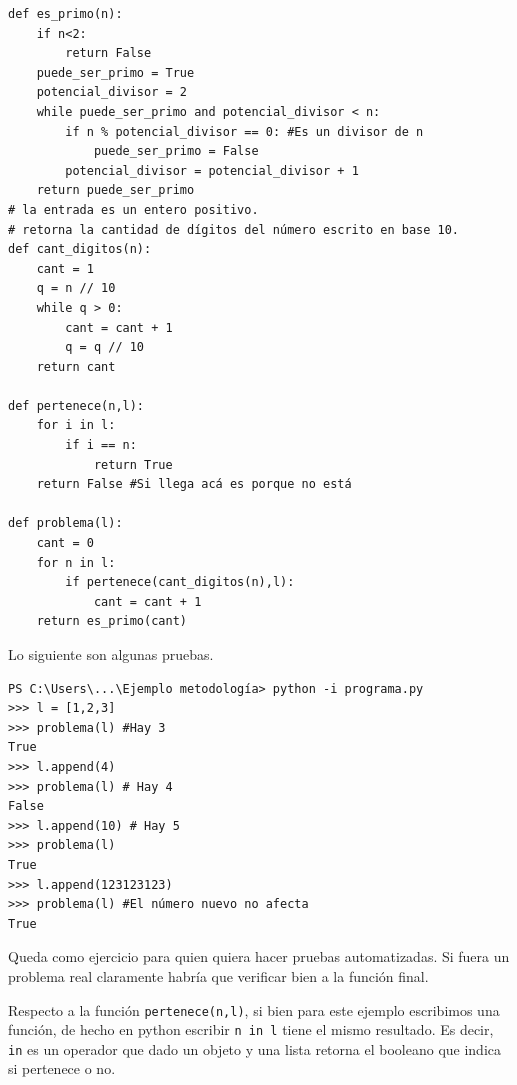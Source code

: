 \documentclass[a4paper, 12pt]{report}
\theoremstyle{definition}
\begin{document}
\begin{verbatim}
def es_primo(n):
    if n<2:
        return False
    puede_ser_primo = True
    potencial_divisor = 2
    while puede_ser_primo and potencial_divisor < n:
        if n % potencial_divisor == 0: #Es un divisor de n
            puede_ser_primo = False
        potencial_divisor = potencial_divisor + 1
    return puede_ser_primo
# la entrada es un entero positivo.
# retorna la cantidad de dígitos del número escrito en base 10.
def cant_digitos(n):
    cant = 1
    q = n // 10
    while q > 0:
        cant = cant + 1
        q = q // 10
    return cant

def pertenece(n,l):
    for i in l:
        if i == n:
            return True
    return False #Si llega acá es porque no está

def problema(l):
    cant = 0
    for n in l:
        if pertenece(cant_digitos(n),l):
            cant = cant + 1
    return es_primo(cant)
\end{verbatim}

Lo siguiente son algunas pruebas.
\begin{verbatim}
PS C:\Users\...\Ejemplo metodología> python -i programa.py
>>> l = [1,2,3] 
>>> problema(l) #Hay 3
True
>>> l.append(4)
>>> problema(l) # Hay 4
False
>>> l.append(10) # Hay 5
>>> problema(l)
True
>>> l.append(123123123) 
>>> problema(l) #El número nuevo no afecta
True
\end{verbatim}
Queda como ejercicio para quien quiera hacer pruebas automatizadas. Si fuera un problema real claramente habría que verificar bien a la función final.

Respecto a la función {\tt pertenece(n,l)}, si bien para este ejemplo escribimos una función, de hecho en python escribir {\tt n in l} tiene el mismo resultado. Es decir, {\tt in} es un operador que dado un objeto y una lista retorna el booleano que indica si pertenece o no.
\end{document}
